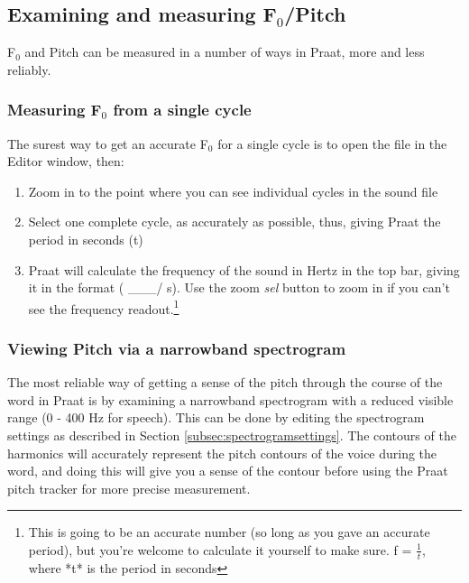 \documentclass[11pt]{article}
\def\tightlist{}
\begin{document}
\hypertarget{examining-and-measuring-f0pitch}{%
\subsection{Examining and measuring
F$_{0}$/Pitch}\label{examining-and-measuring-f0pitch}}

F$_{0}$ and Pitch can be measured in a number of ways in Praat, more and less
reliably.

\hypertarget{measuring-f0-from-a-single-cycle}{%
\subsubsection{Measuring F$_{0}$ from a single
cycle}\label{measuring-f0-from-a-single-cycle}}

The surest way to get an accurate F$_{0}$ for a single cycle is to open the
file in the Editor window, then:

\begin{enumerate}
\def\labelenumi{\arabic{enumi}.}
\tightlist
\item
  Zoom in to the point where you can see individual cycles in the sound
  file
\item
  Select one complete cycle, as accurately as possible, thus, giving
  Praat the period in seconds (t)
\item
  Praat will calculate the frequency of the sound in Hertz in the top
  bar, giving it in the format ( \_\_\_/ s). Use the zoom \emph{sel}
  button to zoom in if you can't see the frequency
  readout.\footnote{This is going to be an accurate number (so long as you gave an accurate period), but you’re welcome to calculate it yourself to make sure.  f = $\frac{1}{t}$, where *t* is the period in seconds}
\end{enumerate}

\hypertarget{viewing-pitch-via-a-narrowband-spectrogram}{%
\subsubsection{Viewing Pitch via a narrowband
spectrogram}\label{viewing-pitch-via-a-narrowband-spectrogram}}

The most reliable way of getting a sense of the pitch through the course
of the word in Praat is by examining a narrowband spectrogram with a
reduced visible range (0 - 400 Hz for speech). This can be done by
editing the spectrogram settings as described in Section
\ref{subsec:spectrogramsettings}. The contours of the harmonics will
accurately represent the pitch contours of the voice during the word,
and doing this will give you a sense of the contour before using the
Praat pitch tracker for more precise measurement.
\end{document}
